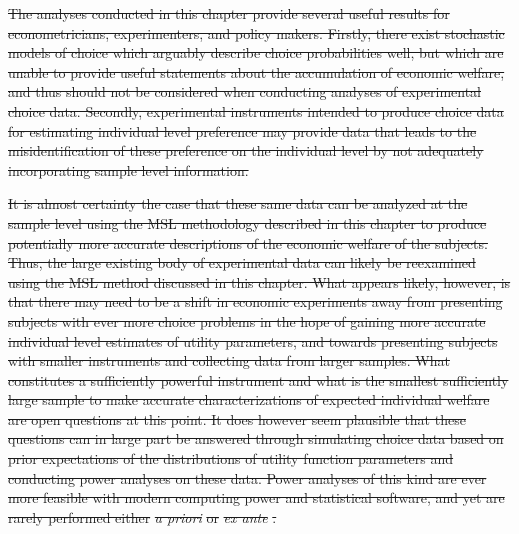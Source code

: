 \documentclass[11pt,a4paper]{report}
\providecommand{\DIFdeltex}[1]{{\protect\color{red}\sout{#1}}}                      %
\providecommand{\DIFdelbegin}{} %
\providecommand{\DIFdelend}{} %
\providecommand{\DIFdel}[1]{\texorpdfstring{\DIFdeltex{#1}}{}} %
\newcommand{\DIFscaledelfig}{0.5}
\newlength{\DIFdelgraphicswidth} %
\newlength{\DIFdelgraphicsheight} %
\newcommand{\DIFdelincludegraphics}[2][]{%
\sbox{\DIFdelgraphicsbox}{\DIFOincludegraphics[#1]{#2}}%
\settoboxwidth{\DIFdelgraphicswidth}{\DIFdelgraphicsbox} %
\settoboxtotalheight{\DIFdelgraphicsheight}{\DIFdelgraphicsbox} %
\scalebox{\DIFscaledelfig}{%
\parbox[b]{\DIFdelgraphicswidth}{\usebox{\DIFdelgraphicsbox}\\[-\baselineskip] \rule{\DIFdelgraphicswidth}{0em}}\llap{\resizebox{\DIFdelgraphicswidth}{\DIFdelgraphicsheight}{%
\setlength{\unitlength}{\DIFdelgraphicswidth}%
\begin{picture}(1,1)%
\thicklines\linethickness{2pt} %
{\color[rgb]{1,0,0}\put(0,0){\framebox(1,1){}}}%
{\color[rgb]{1,0,0}\put(0,0){\line( 1,1){1}}}%
{\color[rgb]{1,0,0}\put(0,1){\line(1,-1){1}}}%
\end{picture}%
}\hspace*{3pt}}} %
} %
\DeclareRobustCommand{\DIFdelbegin}{\DIFOdelbegin \let\includegraphics\DIFdelincludegraphics} %
\DeclareRobustCommand{\DIFdelend}{\DIFOaddend \let\includegraphics\DIFOincludegraphics} %
\begin{document}
\DIFdelbegin \DIFdel{The analyses conducted in this chapter provide several useful results for econometricians, experimenters, and policy makers.
Firstly, there exist stochastic models of choice which arguably describe choice probabilities well, but which are unable to provide useful statements about the accumulation of economic welfare, and thus should not be considered when conducting analyses of experimental choice data.
Secondly, experimental instruments intended to produce choice data for estimating individual level preference may provide data that leads to the misidentification of these preference on the individual level by not adequately incorporating sample level information.
}\DIFdelend %

\DIFdelbegin \DIFdel{It is almost certainty the case that these same data can be analyzed at the sample level using the MSL methodology described in this chapter to produce potentially more accurate descriptions of the economic welfare of the subjects.
Thus, the large existing body of experimental data can likely be reexamined using the MSL method discussed in this chapter.
What appears likely, however, is that there may need to be a shift in economic experiments away from presenting subjects with ever more choice problems in the hope of gaining more accurate individual level estimates of utility parameters, and towards presenting subjects with smaller instruments and collecting data from larger samples.
What constitutes a sufficiently powerful instrument and what is the smallest sufficiently large sample to make accurate characterizations of expected individual welfare are open questions at this point.
It does however seem plausible that these questions can in large part be answered through simulating choice data based on prior expectations of the distributions of utility function parameters and conducting power analyses on these data.
Power analyses of this kind are ever more feasible with modern computing power and statistical software, and yet are rarely performed either }\textit{\DIFdel{a priori}} %
\DIFdel{or }\textit{\DIFdel{ex ante}}%
\DIFdel{.
}\DIFdelend %
\end{document}

